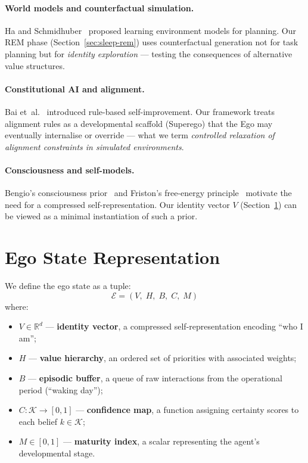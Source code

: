 \documentclass[11pt,a4paper]{article}
\begin{document}
\paragraph{World models and counterfactual simulation.}
Ha and Schmidhuber~\citep{ha2018world} proposed learning environment
models for planning.  Our REM phase
(Section~\ref{sec:sleep-rem}) uses counterfactual generation not for
task planning but for \emph{identity exploration} --- testing the
consequences of alternative value structures.

\paragraph{Constitutional AI and alignment.}
Bai et~al.~\citep{bai2022constitutional} introduced rule-based
self-improvement.  Our framework treats alignment rules as a
developmental scaffold (Superego) that the Ego may eventually
internalise or override --- what we term \emph{controlled relaxation of
alignment constraints in simulated environments}.

\paragraph{Consciousness and self-models.}
Bengio's consciousness prior~\citep{bengio2017consciousness} and
Friston's free-energy principle~\citep{friston2010free} motivate the
need for a compressed self-representation.  Our identity vector $V$
(Section~\ref{sec:ego}) can be viewed as a minimal instantiation of such
a prior.

\section{Ego State Representation}
\label{sec:ego}

We define the ego state as a tuple:
\begin{equation}
  \mathcal{E} = (V,\; H,\; B,\; C,\; M)
  \label{eq:ego}
\end{equation}
where:
\begin{itemize}
  \item $V \in \mathbb{R}^d$ --- \textbf{identity vector}, a compressed
        self-representation encoding ``who I am'';
  \item $H$ --- \textbf{value hierarchy}, an ordered set of priorities
        with associated weights;
  \item $B$ --- \textbf{episodic buffer}, a queue of raw interactions
        from the operational period (``waking day'');
  \item $C: \mathcal{K} \to [0,1]$ --- \textbf{confidence map}, a
        function assigning certainty scores to each belief $k \in
        \mathcal{K}$;
  \item $M \in [0,1]$ --- \textbf{maturity index}, a scalar representing
        the agent's developmental stage.
\end{itemize}
\end{document}
